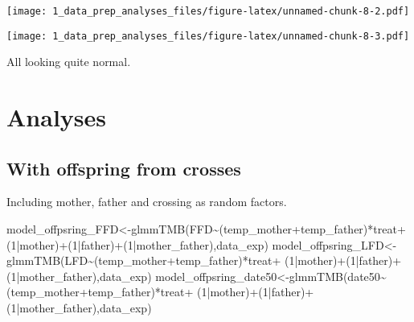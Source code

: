 \documentclass[
]{article}
\newenvironment{Shaded}{\begin{snugshade}}{\end{snugshade}}
\newcommand{\DecValTok}[1]{\textcolor[rgb]{0.00,0.00,0.81}{#1}}
\newcommand{\FunctionTok}[1]{\textcolor[rgb]{0.00,0.00,0.00}{#1}}
\newcommand{\NormalTok}[1]{#1}
\newcommand{\OtherTok}[1]{\textcolor[rgb]{0.56,0.35,0.01}{#1}}
\newcommand{\SpecialCharTok}[1]{\textcolor[rgb]{0.00,0.00,0.00}{#1}}
\begin{document}
\texttt{[image: 1\_data\_prep\_analyses\_files/figure-latex/unnamed-chunk-8-2.pdf]}

\begin{Shaded}
\end{Shaded}

\texttt{[image: 1\_data\_prep\_analyses\_files/figure-latex/unnamed-chunk-8-3.pdf]}

All looking quite normal.

\hypertarget{analyses}{%
\section{Analyses}\label{analyses}}

\hypertarget{with-offspring-from-crosses}{%
\subsection{With offspring from
crosses}\label{with-offspring-from-crosses}}

Including mother, father and crossing as random factors.

\begin{Shaded}
\begin{Highlighting}[]
\NormalTok{model\_offpsring\_FFD}\OtherTok{\textless{}{-}}\FunctionTok{glmmTMB}\NormalTok{(FFD}\SpecialCharTok{\textasciitilde{}}\NormalTok{(temp\_mother}\SpecialCharTok{+}\NormalTok{temp\_father)}\SpecialCharTok{*}\NormalTok{treat}\SpecialCharTok{+}
\NormalTok{                               (}\DecValTok{1}\SpecialCharTok{|}\NormalTok{mother)}\SpecialCharTok{+}\NormalTok{(}\DecValTok{1}\SpecialCharTok{|}\NormalTok{father)}\SpecialCharTok{+}\NormalTok{(}\DecValTok{1}\SpecialCharTok{|}\NormalTok{mother\_father),data\_exp)}
\NormalTok{model\_offpsring\_LFD}\OtherTok{\textless{}{-}}\FunctionTok{glmmTMB}\NormalTok{(LFD}\SpecialCharTok{\textasciitilde{}}\NormalTok{(temp\_mother}\SpecialCharTok{+}\NormalTok{temp\_father)}\SpecialCharTok{*}\NormalTok{treat}\SpecialCharTok{+}
\NormalTok{                               (}\DecValTok{1}\SpecialCharTok{|}\NormalTok{mother)}\SpecialCharTok{+}\NormalTok{(}\DecValTok{1}\SpecialCharTok{|}\NormalTok{father)}\SpecialCharTok{+}\NormalTok{(}\DecValTok{1}\SpecialCharTok{|}\NormalTok{mother\_father),data\_exp)}
\NormalTok{model\_offpsring\_date50}\OtherTok{\textless{}{-}}\FunctionTok{glmmTMB}\NormalTok{(date50}\SpecialCharTok{\textasciitilde{}}\NormalTok{(temp\_mother}\SpecialCharTok{+}\NormalTok{temp\_father)}\SpecialCharTok{*}\NormalTok{treat}\SpecialCharTok{+}
\NormalTok{                               (}\DecValTok{1}\SpecialCharTok{|}\NormalTok{mother)}\SpecialCharTok{+}\NormalTok{(}\DecValTok{1}\SpecialCharTok{|}\NormalTok{father)}\SpecialCharTok{+}\NormalTok{(}\DecValTok{1}\SpecialCharTok{|}\NormalTok{mother\_father),data\_exp)}
\end{Highlighting}
\end{Shaded}
\end{document}
